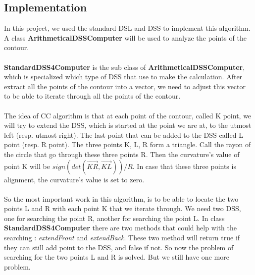\subsection{Implementation}
In this project, we used the standard DSL and DSS to implement this algorithm. A class \textbf{ArithmeticalDSSComputer} will be used to analyze the points of the contour.

\paragraph{}
\textbf{StandardDSS4Computer} is the sub class of \textbf{ArithmeticalDSSComputer}, which is specialized which type of DSS that use to make the calculation. After extract all the points of the contour into a vector, we need to adjust this vector to be able to iterate through all the points of the contour. 

\paragraph{}
The idea of CC algorithm is that at each point of the contour, called K point, we will try to extend the DSS, which is started at the point we are at, to the utmost left (resp. utmost right). The last point that can be added to the DSS called L point (resp. R point). The three points K, L, R form a triangle. Call the rayon of the circle that go through these three points R. Then the curvature's value of point K will be $sign(det(\overrightarrow{KR}, \overrightarrow{KL}))/R$.  In case that these three points is alignment, the curvature's value is set to zero.

\paragraph{}
So the most important work in this algorithm, is to be able to locate the two points L and R with each point K that we iterate through. We need two DSS, one for searching the point R, another for searching the point L. In class \textbf{StandardDSS4Computer} there are two methods that could help with the searching : \textit{extendFront} and \textit{extendBack}. These two method will return true if they can still add point to the DSS, and false if not. So now the problem of searching for the two points L and R is solved. But we still have one more problem.

